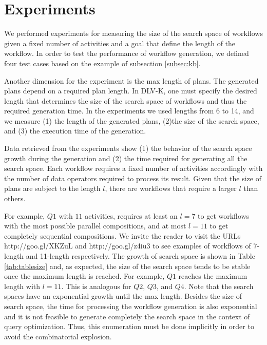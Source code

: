 
\section{Experiments} \label{sec:experiments}

We performed experiments for measuring the size of the search space of workflows given a fixed number of activities and a goal that define the length of the workflow. In order to test the performance of workflow generation, we  defined four test cases  based on the example of subsection \ref{subsec:kb}.
	
Another dimension for the experiment is the max length of plans. The generated plans depend on a required plan length. In DLV-K, one must specify the desired length that determines the size of the search space of workflows and thus the required generation time. In the experiments we used lengths from 6 to 14, and we measure (1) the length of the generated plans, (2)the size of the search space, and (3) the execution time of the generation.

Data retrieved from the experiments show (1) the behavior of the search space growth during the generation and (2) the time required for generating all the search space. Each workflow requires a fixed number of activities accordingly with the number of data operators required to process its result. Given that the size of plans are subject to the length $l$, there are workflows that require a larger $l$ than others.

For example, $Q1$ with $11$ activities, requires at least an $l=7$ to get workflows with the most possible parallel compositions, and at most $l=11$ to get completely sequential compositions. We invite the reader to visit the URLs http://goo.gl/XKZuL and http://goo.gl/z4iu3 to see examples of workflows of 7-length and 11-length respectively. The growth of search space is shown in Table \ref{tab:tablesize} and, as  expected, the size of the search space tends to be stable once the maximum length is reached. For example, $Q1$ reaches the maximum length with $l=11$. This is analogous for $Q2$, $Q3$, and $Q4$. Note that the search spaces have an exponential growth until the max length.
Besides the size of search space, the time for processing the workflow generation is also exponential and it is not feasible to generate completely the search space in the context of query optimization. Thus, this enumeration must be done implicitly in order to avoid the combinatorial explosion.





